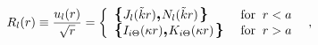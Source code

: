 \begin{equation}
  R_{l}(r)
\equiv
\frac{ u_{l}(r) }{\sqrt{r}}
=\left\{\begin{array}{lr}
    \mbox{\boldmath\large  $\left\{  \right.$ } \! \! \!
J_{l} (\tilde k r)
\mbox{\boldmath\large  $,$ } \!   \!
N_{l} (\tilde k r)
\mbox{\boldmath\large  $\left.  \right\}$ } \! \!
\;  
& \textrm{for}
\;\; r<a 
\\
\mbox{\boldmath\large  $\left\{  \right.$ } \! \! \!
I_{i\Theta}(\kappa r)
\mbox{\boldmath\large  $,$ } \!   \!
 K_{i \Theta} (\kappa r) 
\mbox{\boldmath\large  $\left.  \right\}$ } \! \!
\;  
 & \textrm{for} \;\; r>a \\
  \end{array}
\right.
\;   \;   ,
\label{eq:Bessel_solution_2D_ISP_circular_well_reg}
\end{equation}

